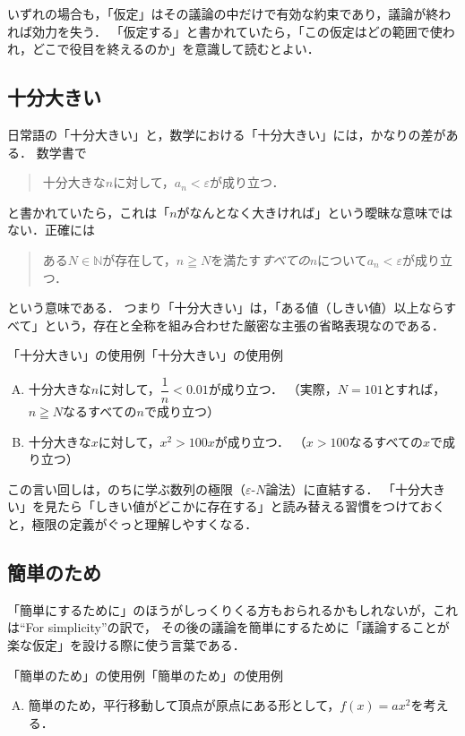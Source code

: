 いずれの場合も，「仮定」はその議論の中だけで有効な約束であり，議論が終われば効力を失う．
「仮定する」と書かれていたら，「この仮定はどの範囲で使われ，どこで役目を終えるのか」を意識して読むとよい．

\subsection{十分大きい}

日常語の「十分大きい」と，数学における「十分大きい」には，かなりの差がある．
数学書で
\begin{quote}
  十分大きな$n$に対して，$a_n < \varepsilon$が成り立つ．
\end{quote}
と書かれていたら，これは「$n$がなんとなく大きければ」という曖昧な意味ではない．正確には
\begin{quote}
  ある$N \in \mathbb{N}$が存在して，$n \geqq N$を満たす\emph{すべての}$n$について$a_n < \varepsilon$が成り立つ．
\end{quote}
という意味である．
つまり「十分大きい」は，「ある値（しきい値）以上ならすべて」という，存在と全称を組み合わせた厳密な主張の省略表現なのである．

\begin{example}{「十分大きい」の使用例}{「十分大きい」の使用例}
  \begin{enumerate}[(A)]
    \item 十分大きな$n$に対して，$\dfrac{1}{n} < 0.01$が成り立つ．
    （実際，$N=101$とすれば，$n \geqq N$なるすべての$n$で成り立つ）
    \item 十分大きな$x$に対して，$x^2 > 100x$が成り立つ．
    （$x > 100$なるすべての$x$で成り立つ）
  \end{enumerate}
\end{example}

この言い回しは，のちに学ぶ数列の極限（$\varepsilon$-$N$論法）に直結する．
「十分大きい」を見たら「しきい値がどこかに存在する」と読み替える習慣をつけておくと，極限の定義がぐっと理解しやすくなる．

\subsection{簡単のため}

「簡単にするために」のほうがしっくりくる方もおられるかもしれないが，これは``For simplicity''の訳で，
その後の議論を簡単にするために「議論することが楽な仮定」を設ける際に使う言葉である．

\begin{example}{「簡単のため」の使用例}{「簡単のため」の使用例}
  \begin{enumerate}[(A)]
    \item 簡単のため，平行移動して頂点が原点にある形として，$f(x)=ax^2$を考える．
  \end{enumerate}
\end{example}

